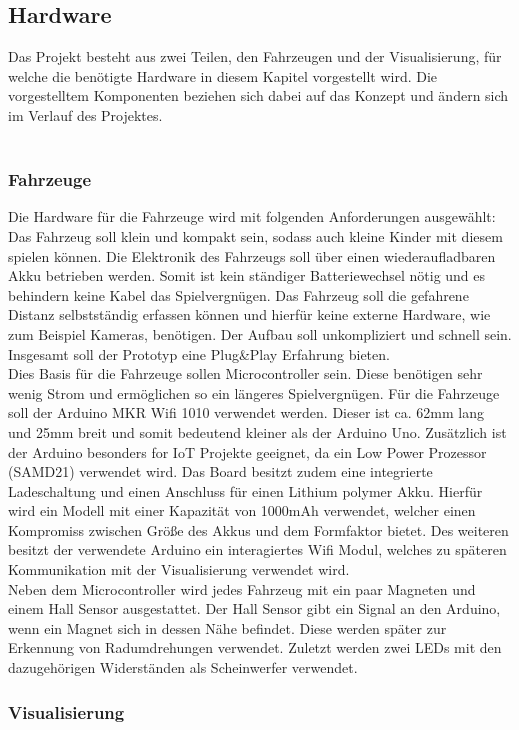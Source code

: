 \documentclass[.../Dokumentation.tex]{subfiles}
\begin{document}
    \subsection{Hardware}\label{sec-components-hardware}
    Das Projekt besteht aus zwei Teilen, den Fahrzeugen und der Visualisierung, für welche die benötigte Hardware in diesem Kapitel vorgestellt wird. Die vorgestelltem Komponenten beziehen sich dabei auf das Konzept und ändern sich im Verlauf des Projektes.\\~\\
    \subsubsection{Fahrzeuge}
	Die Hardware für die Fahrzeuge wird mit folgenden Anforderungen ausgewählt: Das Fahrzeug soll klein und kompakt sein, sodass auch kleine Kinder mit diesem spielen können. Die Elektronik des Fahrzeugs soll über einen wiederaufladbaren Akku betrieben werden. Somit ist kein ständiger Batteriewechsel nötig und es behindern keine Kabel das Spielvergnügen. Das Fahrzeug soll die gefahrene Distanz selbstständig erfassen können und hierfür keine externe Hardware, wie zum Beispiel Kameras, benötigen. Der Aufbau soll unkompliziert und schnell sein. Insgesamt soll der Prototyp eine Plug\&Play Erfahrung bieten.\\
	Dies Basis für die Fahrzeuge sollen Microcontroller sein. Diese benötigen sehr wenig Strom und ermöglichen so ein längeres Spielvergnügen. Für die Fahrzeuge soll der Arduino MKR Wifi 1010 verwendet werden. Dieser ist ca. 62mm lang und 25mm breit und somit bedeutend kleiner als der Arduino Uno. Zusätzlich ist der Arduino besonders for IoT Projekte geeignet, da ein Low Power Prozessor (SAMD21) verwendet wird. Das Board besitzt zudem eine integrierte Ladeschaltung und einen Anschluss für einen Lithium polymer Akku. Hierfür wird ein Modell mit einer Kapazität von 1000mAh verwendet, welcher einen Kompromiss zwischen Größe des Akkus und dem Formfaktor bietet. Des weiteren besitzt der verwendete Arduino ein interagiertes Wifi Modul, welches zu späteren Kommunikation mit der Visualisierung verwendet wird. \\
	Neben dem Microcontroller wird jedes Fahrzeug mit ein paar Magneten und einem Hall Sensor ausgestattet. Der Hall Sensor gibt ein Signal an den Arduino, wenn ein Magnet sich in dessen Nähe befindet. Diese werden später zur Erkennung von Radumdrehungen verwendet. Zuletzt werden zwei LEDs mit den dazugehörigen Widerständen als Scheinwerfer verwendet.
	
	\subsubsection{Visualisierung}
	
\end{document}

